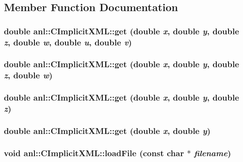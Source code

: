 \subsection{Member Function Documentation}
\hypertarget{classanl_1_1CImplicitXML_a6bdd767f337be91cc3cf95e4c172a8a3}{
\subsubsection[{get}]{\setlength{\rightskip}{0pt plus 5cm}double anl::CImplicitXML::get (double {\em x}, \/  double {\em y}, \/  double {\em z}, \/  double {\em w}, \/  double {\em u}, \/  double {\em v})}}
\label{classanl_1_1CImplicitXML_a6bdd767f337be91cc3cf95e4c172a8a3}
\hypertarget{classanl_1_1CImplicitXML_a6a1ee214ecc3286da0d425b92c46445f}{
\subsubsection[{get}]{\setlength{\rightskip}{0pt plus 5cm}double anl::CImplicitXML::get (double {\em x}, \/  double {\em y}, \/  double {\em z}, \/  double {\em w})}}
\label{classanl_1_1CImplicitXML_a6a1ee214ecc3286da0d425b92c46445f}
\hypertarget{classanl_1_1CImplicitXML_a712467ddab5312c4b88a15f160ebfdc7}{
\subsubsection[{get}]{\setlength{\rightskip}{0pt plus 5cm}double anl::CImplicitXML::get (double {\em x}, \/  double {\em y}, \/  double {\em z})}}
\label{classanl_1_1CImplicitXML_a712467ddab5312c4b88a15f160ebfdc7}
\hypertarget{classanl_1_1CImplicitXML_ac69233990a7d20217fb13506f5b3b73a}{
\subsubsection[{get}]{\setlength{\rightskip}{0pt plus 5cm}double anl::CImplicitXML::get (double {\em x}, \/  double {\em y})}}
\label{classanl_1_1CImplicitXML_ac69233990a7d20217fb13506f5b3b73a}
\hypertarget{classanl_1_1CImplicitXML_a835b31bdfda2b630702871d4b874430c}{
\subsubsection[{loadFile}]{\setlength{\rightskip}{0pt plus 5cm}void anl::CImplicitXML::loadFile (const char $\ast$ {\em filename})}}
